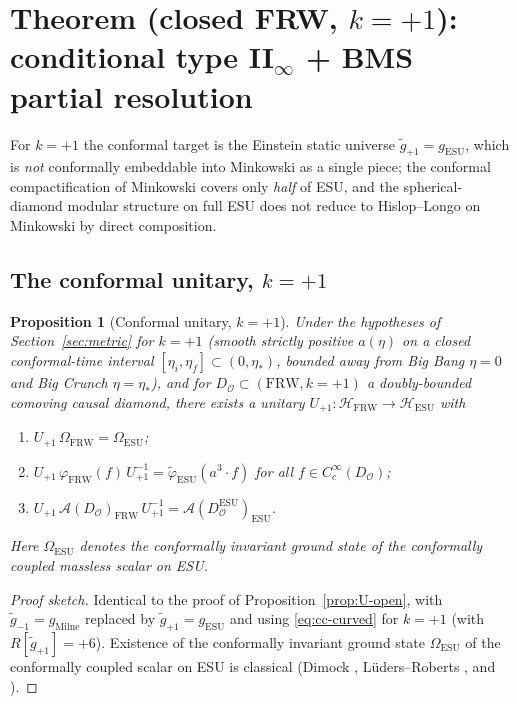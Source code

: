 \documentclass[11pt]{article}
\newtheorem{proposition}[theorem]{Proposition}
\theoremstyle{definition}
\newcommand{\HH}{\mathcal{H}}
\renewcommand{\AA}{\mathcal{A}}
\newcommand{\OO}{\mathcal{O}}
\newcommand{\FRW}{\mathrm{FRW}}
\newcommand{\ESU}{\mathrm{ESU}}
\newcommand{\Milne}{\mathrm{Milne}}
\begin{document}
\section{Theorem (closed FRW, $k=+1$): conditional type II$_\infty$ + BMS partial resolution}
\label{sec:closed}

For $k=+1$ the conformal target is the Einstein static universe
$\tilde g_{+1}=g_\ESU$, which is \emph{not} conformally embeddable into
Minkowski as a single piece; the conformal compactification of Minkowski
covers only \emph{half} of ESU, and the spherical-diamond modular structure
on full ESU does not reduce to Hislop--Longo on Minkowski by direct
composition.

\subsection{The conformal unitary, $k=+1$}\label{sec:U-closed}

\begin{proposition}[Conformal unitary, $k=+1$]\label{prop:U-closed}
Under the hypotheses of Section~\ref{sec:metric} for $k=+1$ (smooth strictly
positive $a(\eta)$ on a closed conformal-time interval $[\eta_i,\eta_f]
\subset(0,\eta_*)$, bounded away from Big Bang $\eta=0$ and Big Crunch
$\eta=\eta_*$), and for $D_\OO\subset(\FRW,k=+1)$ a doubly-bounded comoving
causal diamond, there exists a unitary $U_{+1}:\HH_\FRW\to\HH_\ESU$ with
\begin{enumerate}
\item[(i)] $U_{+1}\,\Omega_\FRW=\Omega_\ESU$;
\item[(ii)] $U_{+1}\,\varphi_\FRW(f)\,U_{+1}^{-1}=\tilde\varphi_\ESU(a^3\cdot f)$
for all $f\in C_c^\infty(D_\OO)$;
\item[(iii)] $U_{+1}\,\AA(D_\OO)_\FRW\,U_{+1}^{-1}=\AA(D_\OO^\ESU)_\ESU$.
\end{enumerate}
Here $\Omega_\ESU$ denotes the conformally invariant ground state of the
conformally coupled massless scalar on ESU.
\end{proposition}

\begin{proof}[Proof sketch]
Identical to the proof of Proposition~\ref{prop:U-open}, with $\tilde
g_{-1}=g_\Milne$ replaced by $\tilde g_{+1}=g_\ESU$ and using
\eqref{eq:cc-curved} for $k=+1$ (with $R[\tilde g_{+1}]=+6$). Existence of
the conformally invariant ground state $\Omega_\ESU$ of the conformally
coupled scalar on ESU is classical (Dimock \cite{Dimock1980},
L\"uders--Roberts \cite{LudersRoberts1990}, and \cite[\S5.4]{Wald1994}).
\end{proof}
\end{document}

